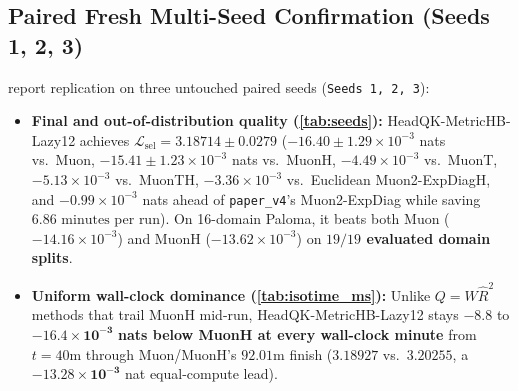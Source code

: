 \documentclass[11pt]{article}
\newcommand{\Lsel}{\mathcal{L}_{\mathrm{sel}}}
\newcommand{\mname}[1]{#1}
\begin{document}
\subsection{Paired Fresh Multi-Seed Confirmation (Seeds 1, 2, 3)}

 report replication on three untouched paired seeds (\texttt{Seeds 1, 2, 3}):
\begin{itemize}
  \item \textbf{Final and out-of-distribution quality (\cref{tab:seeds}):} \mname{HeadQK-MetricHB-Lazy12} achieves $\Lsel = \mathbf{3.18714 \pm 0.0279}$ ($\mathbf{-16.40 \pm 1.29}\times 10^{-3}$ nats vs.\ \mname{Muon}, $\mathbf{-15.41 \pm 1.23}\times 10^{-3}$ nats vs.\ \mname{MuonH}, $-4.49\times 10^{-3}$ vs.\ \mname{MuonT}, $-5.13\times 10^{-3}$ vs.\ \mname{MuonTH}, $-3.36\times 10^{-3}$ vs.\ Euclidean \mname{Muon2-ExpDiagH}, and $-0.99\times 10^{-3}$ nats ahead of \texttt{paper\_v4}'s \mname{Muon2-ExpDiag} while saving $6.86\text{ minutes}$ per run). On 16-domain Paloma, it beats both \mname{Muon} ($-14.16\times 10^{-3}$) and \mname{MuonH} ($-13.62\times 10^{-3}$) on \textbf{$19/19$ evaluated domain splits}.
  \item \textbf{Uniform wall-clock dominance (\cref{tab:isotime_ms}):} Unlike $Q = W\hat{R}^2$ methods that trail \mname{MuonH} mid-run, \mname{HeadQK-MetricHB-Lazy12} stays $\mathbf{-8.8}$ to $\mathbf{-16.4\times 10^{-3}}$ \textbf{nats below \mname{MuonH} at every wall-clock minute} from $t = 40\text{m}$ through \mname{Muon}/\mname{MuonH}'s $92.01\text{m}$ finish ($\mathbf{3.18927}$ vs.\ $3.20255$, a $\mathbf{-13.28\times 10^{-3}}$ nat equal-compute lead).
\end{itemize}
\end{document}

